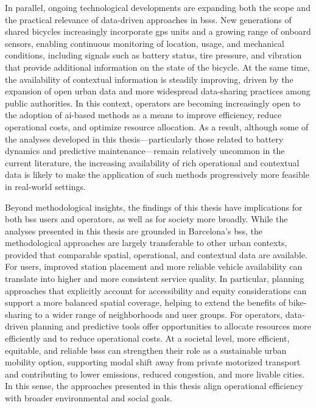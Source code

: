 In parallel, ongoing technological developments are expanding both the scope and the practical relevance of data-driven approaches in \acp{bss}. New generations of shared bicycles increasingly incorporate \ac{gps} units and a growing range of onboard sensors, enabling continuous monitoring of location, usage, and mechanical conditions, including signals such as battery status, tire pressure, and vibration that provide additional information on the state of the bicycle. At the same time, the availability of contextual information is steadily improving, driven by the expansion of open urban data and more widespread data-sharing practices among public authorities. In this context, operators are becoming increasingly open to the adoption of \ac{ai}-based methods as a means to improve efficiency, reduce operational costs, and optimize resource allocation. As a result, although some of the analyses developed in this thesis—particularly those related to battery dynamics and predictive maintenance—remain relatively uncommon in the current literature, the increasing availability of rich operational and contextual data is likely to make the application of such methods progressively more feasible in real-world settings.

Beyond methodological insights, the findings of this thesis have implications for both \ac{bss} users and operators, as well as for society more broadly. While the analyses presented in this thesis are grounded in Barcelona’s \ac{bss}, the methodological approaches are largely transferable to other urban contexts, provided that comparable spatial, operational, and contextual data are available. For users, improved station placement and more reliable vehicle availability can translate into higher and more consistent service quality. In particular, planning approaches that explicitly account for accessibility and equity considerations can support a more balanced spatial coverage, helping to extend the benefits of bike-sharing to a wider range of neighborhoods and user groups. For operators, data-driven planning and predictive tools offer opportunities to allocate resources more efficiently and to reduce operational costs. At a societal level, more efficient, equitable, and reliable \acp{bss} can strengthen their role as a sustainable urban mobility option, supporting modal shift away from private motorized transport and contributing to lower emissions, reduced congestion, and more livable cities. In this sense, the approaches presented in this thesis align operational efficiency with broader environmental and social goals.

